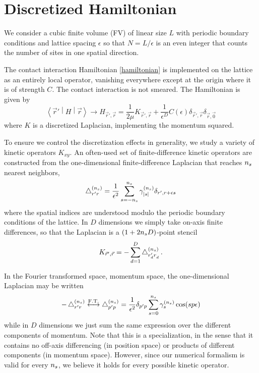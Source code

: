 \section{Discretized Hamiltonian}\label{sec:hamiltonian}

We consider a cubic finite volume (FV) of linear size $L$ with periodic boundary conditions and lattice spacing $\epsilon$ so that $N=L/\epsilon$ is an even integer that counts the number of sites in one spatial direction.

The contact interaction Hamiltonian \eqref{hamiltonian} is implemented on the lattice as an entirely local operator, vanishing everywhere except at the origin where it is of strength $C$.
The contact interaction is not smeared.
The Hamiltonian is given by
\begin{equation}
    \left\langle \vec{r}' \middle| H \middle| \vec{r} \right\rangle
    \rightarrow
    H_{\vec{r}',\vec{r}}
    =
    \frac{1}{2\mu} K_{\vec{r}',\vec{r}} + \frac{1}{\epsilon^D} C(\epsilon) \delta_{\vec{r}',\vec{r}} \delta_{\vec{r},\vec{0}}
\end{equation}
where $K$ is a discretized Laplacian, implementing the momentum squared.

To ensure we control the discretization effects in generality, we study a variety of kinetic operators $K_{xy}$.
An often-used set of finite-difference kinetic operators are constructed from the one-dimensional finite-difference Laplacian that reaches ${n_s}$ nearest neighbors,
\begin{equation}
    \mathop{}\!\mathbin\bigtriangleup^{({n_s})}_{r'r} = \frac{1}{\epsilon^2}\sum_{s=-{n_s}}^{{n_s}} \gamma_{\left| s \right|}^{({n_s})} \delta_{r',r+\epsilon s}
\end{equation}
where the spatial indices are understood modulo the periodic boundary conditions of the lattice.
In $D$ dimensions we simply take on-axis finite differences, so that the Laplacian is a $(1+2{n_s} D)$-point stencil
\begin{equation}
    K_{\vec{r}',\vec{r}}
    =
    - \sum_{d=1}^D \mathop{}\!\mathbin\bigtriangleup_{r_d'r_d^{}}^{({n_s})}
    \, .
\end{equation}

In the Fourier transformed space, momentum space, the one-dimensional Laplacian may be written
\begin{equation}
    \label{eq:laplacian}
    -\mathop{}\!\mathbin\bigtriangleup_{r'r^{}}^{({n_s})}
    \overset{\text{F.T.}}{\longleftrightarrow}
    \mathop{}\!\mathbin\bigtriangleup^{({n_s})}_{p'p}
    =
    \frac{1}{\epsilon^2}
    \delta_{p'p}
    \sum_{s=0}^{{n_s}} \gamma_s^{({n_s})} \cos(s p \epsilon)
\end{equation}
while in $D$ dimensions we just sum the same expression over the different components of momentum.
Note that this is a specialization, in the sense that it contains no off-axis differencing (in position space) or products of different components (in momentum space).
However, since our numerical formalism is valid for every ${n_s}$, we believe it holds for every possible kinetic operator.

